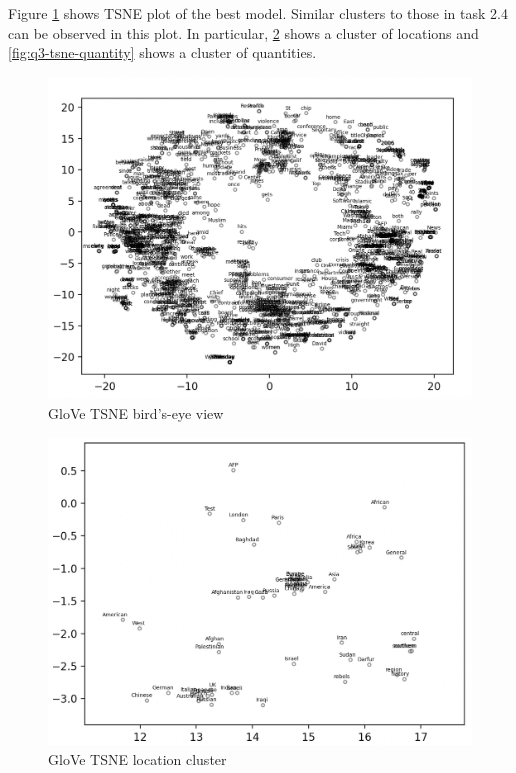 \documentclass[12pt,article]{article}
\begin{document}
\newpage

Figure \ref{fig:q3-tsne-overview} shows TSNE plot of the best model. Similar clusters to those in task 2.4 can be observed in this plot. In particular, \ref{fig:q3-tsne-location} shows a cluster of locations and \ref{fig:q3-tsne-quantity} shows a cluster of quantities.

\begin{figure}[H]
    \centering
    \includegraphics[scale=0.5]{glove_tsne_birdview.png} \par
    \caption{GloVe TSNE bird's-eye view}
    \label{fig:q3-tsne-overview}
\end{figure}

\begin{figure}[H]
    \centering
    \includegraphics[scale=0.5]{glove_tsne_location_cluster.png} \par
    \caption{GloVe TSNE location cluster}
    \label{fig:q3-tsne-location}
\end{figure}
\end{document}

